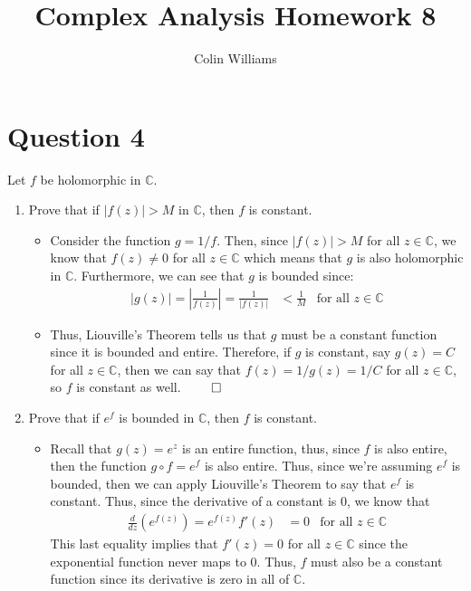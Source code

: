 \documentclass[10pt,a4paper]{article}
\title{Complex Analysis Homework 8}
\author{Colin Williams}
\theoremstyle{definition}
\begin{document}
\maketitle

\section*{Question 4}
Let $f$ be holomorphic in $\mathbb{C}$.
\begin{enumerate}[label = (\alph*)]
\item Prove that if $|f(z)| > M$ in $\mathbb{C}$, then $f$ is constant.
	\begin{itemize}
	\item Consider the function $g = 1/f$. Then, since $|f(z)| > M$ for all $z \in \mathbb{C}$, we know that $f(z) \neq 0$ for all $z \in \mathbb{C}$ which means that $g$ is also holomorphic in $\mathbb{C}$. Furthermore, we can see that $g$ is bounded since:
	\begin{align*}
	|g(z)| = \left|\frac{1}{f(z)}\right| = \frac{1}{|f(z)|} &< \frac{1}{M} &\text{for all $z \in \mathbb{C}$}
	\end{align*}
	\item Thus, Liouville's Theorem tells us that $g$ must be a constant function since it is bounded and entire. Therefore, if $g$ is constant, say $g(z) = C$ for all $z \in \mathbb{C}$, then we can say that $f(z) = 1/g(z) = 1/C$ for all $z \in \mathbb{C}$, so $f$ is constant as well. $\qed$
	\end{itemize}
\item Prove that if $e^f$ is bounded in $\mathbb{C}$, then $f$ is constant. 
	\begin{itemize}
	\item Recall that $g(z) = e^z$ is an entire function, thus, since $f$ is also entire, then the function $g \circ f = e^f$ is also entire. Thus, since we're assuming $e^f$ is bounded, then we can apply Liouville's Theorem to say that $e^f$ is constant. Thus, since the derivative of a constant is 0, we know that
	\begin{align*}
	\frac{d}{dz}\left(e^{f(z)}\right) = e^{f(z)}f'(z) &= 0 &\text{for all $z \in \mathbb{C}$}
	\end{align*}
	This last equality implies that $f'(z) = 0$ for all $z \in \mathbb{C}$ since the exponential function never maps to 0. Thus, $f$ must also be a constant function since its derivative is zero in all of $\mathbb{C}$.
	\end{itemize}
\end{enumerate}
\end{document}
